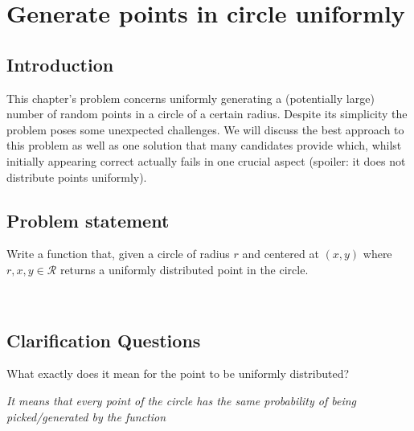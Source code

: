%

\chapter{Generate points in circle uniformly}
\label{ch:random_points_in_circle}
\section*{Introduction}
This chapter's problem concerns uniformly generating a (potentially large) number of random points in a circle of a certain radius. Despite its simplicity the problem poses some unexpected challenges. We will discuss the best approach to this problem as well as one solution that many candidates provide which, whilst initially appearing correct actually fails in one crucial aspect (spoiler: it does not distribute points uniformly). 

\section{Problem statement}
\begin{exercise}
Write a function that, given a circle of radius $r$ and centered at $(x,y)$ where $r,x,y \in \mathcal{R}$ returns a uniformly distributed point in the circle.
\end{exercise}



\begin{example}
	\hfill \\

	
\end{example}

\section{Clarification Questions}

\begin{QandA}
	\item \begin{questionitem} \begin{question} What exactly does it mean for the point to be uniformly distributed?  \end{question} 	 
    \begin{answered}
		\textit{It means that every point of the circle has the same probability of being picked/generated by the function}
	\end{answered} \end{questionitem}
\end{QandA}

